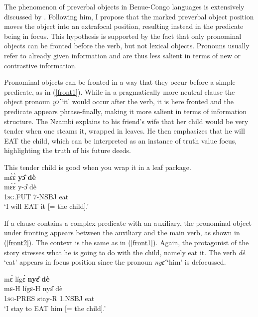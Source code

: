 The phenomenon of preverbal objects in Benue-Congo languages is extensively discussed by \citet{guldemann2007}. Following him, I propose that the marked preverbal object position moves the object into an extrafocal position, resulting instead in the predicate being in focus. This hypothesis is supported by the fact that only pronominal objects can be fronted before the verb, but not lexical objects. Pronouns usually refer to already given information and are thus less salient in terms of new or contrastive information.

Pronominal objects can be fronted in a way that they occur before a simple predicate, as in (\ref{front1}). While in a pragmatically more neutral clause the object pronoun {\itshape yɔ̂} `it' would occur after the verb, it is here fronted and the predicate appears phrase-finally, making it more salient in terms of information structure. The Nzambi explains to his friend's wife that her child would be very tender when one steams it, wrapped in leaves. He then emphasizes that he will EAT the child, which can be interpreted as an instance of truth value focus, highlighting the truth of his future deeds.


\begin{exe} 
\ex\label{front1} This tender child is good when you wrap it in a  leaf package.\\
  \glll mɛ̀ɛ̀ {\bfseries yɔ̂} {\bfseries dè}\\
         mɛ̀ɛ̀ y-ɔ̂ dè\\
        1\textsc{sg}.FUT 7-NSBJ eat\\
    \trans `I will EAT it [= the child].'
\end{exe}

If a clause contains a complex predicate with an auxiliary, the pronominal object under fronting appears between the auxiliary and the main verb, as shown in (\ref{front2}). The context is the same as in (\ref{front1}). Again, the protagonist of the story stresses what he is going to do with the child, namely eat it. The verb {\itshape dè} `eat' appears in focus position since the pronoun {\itshape nyɛ̂} `him' is defocussed.

\begin{exe} 
\ex\label{front2}
  \glll  mɛ́ lígɛ́ {\bfseries nyɛ̂} {\bfseries dè} \\
        mɛ-H lígɛ-H nyɛ̂ dè \\
         1\textsc{sg}-PRES stay-R 1.NSBJ eat   \\
    \trans `I stay to EAT him [= the child].'
\end{exe}

